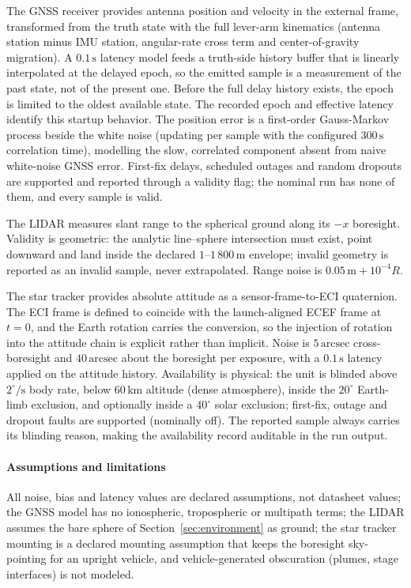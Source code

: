 The \ac{GNSS} receiver provides antenna position and velocity in the
external frame, transformed from the truth state with the full lever-arm
kinematics (antenna station minus \ac{IMU} station, angular-rate cross
term and center-of-gravity migration). A $0.1\,\mathrm{s}$ latency model
feeds a truth-side history buffer that is linearly interpolated at the
delayed epoch, so the emitted sample is a measurement of the past state,
not of the present one. Before the full delay history exists, the epoch is limited to the oldest available state. The recorded epoch and effective latency identify this startup behavior. The position error is a first-order Gauss-Markov
process beside the white noise (updating per sample with the configured
$300\,\mathrm{s}$ correlation time), modelling the slow, correlated
component absent from naive white-noise \ac{GNSS} error. First-fix delays,
scheduled outages and random dropouts are supported and reported through
a validity flag; the nominal run has none of them, and every sample is
valid.

The \ac{LIDAR} measures slant range to the spherical ground along its
$-x$ boresight. Validity is geometric: the analytic line--sphere
intersection must exist, point downward and land inside the declared
$1$--$1\,800\,\mathrm{m}$ envelope; invalid geometry is reported as an
invalid sample, never extrapolated. Range noise is
$0.05\,\mathrm{m} + 10^{-4}R$.

The star tracker provides absolute attitude as a sensor-frame-to-\ac{ECI}
quaternion. The \ac{ECI} frame is defined to coincide with the
launch-aligned \ac{ECEF} frame at $t = 0$, and the Earth rotation carries
the conversion, so the injection of rotation into the attitude chain is
explicit rather than implicit. Noise is $5\,\mathrm{arcsec}$
cross-boresight and $40\,\mathrm{arcsec}$ about the boresight per
exposure, with a $0.1\,\mathrm{s}$ latency applied on the attitude
history. Availability is physical: the unit is blinded above
$2^{\circ}/\mathrm{s}$ body rate, below $60\,\mathrm{km}$ altitude
(dense atmosphere), inside the $20^{\circ}$ Earth-limb exclusion, and
optionally inside a $40^{\circ}$ solar exclusion; first-fix, outage and
dropout faults are supported (nominally off). The reported sample always
carries its blinding reason, making the availability record auditable in
the run output.

\paragraph*{Assumptions and limitations}
All noise, bias and latency values are declared assumptions, not datasheet
values; the \ac{GNSS} model has no ionospheric, tropospheric or multipath
terms; the \ac{LIDAR} assumes the bare sphere of
Section~\ref{sec:environment} as ground; the star tracker mounting is a
declared mounting assumption that keeps the boresight sky-pointing for an upright vehicle,
and vehicle-generated obscuration (plumes, stage interfaces) is not
modeled.
